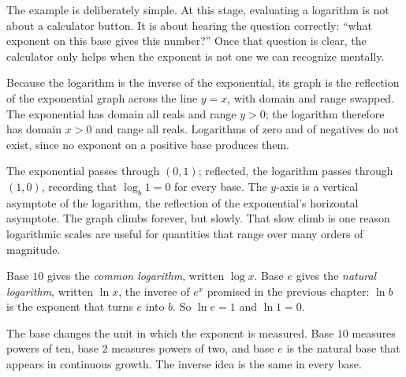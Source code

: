 \documentclass[12pt]{book}
\begin{document}
The example is deliberately simple. At this stage, evaluating a logarithm is not about a
calculator button. It is about hearing the question correctly: ``what exponent on this
base gives this number?'' Once that question is clear, the calculator only helps when the
exponent is not one we can recognize mentally.

Because the logarithm is the inverse of the exponential, its graph is the reflection
of the exponential graph across the line $y=x$, with domain and range swapped. The
exponential has domain all reals and range $y>0$; the logarithm therefore has domain
$x>0$ and range all reals. Logarithms of zero and of negatives do not exist, since no
exponent on a positive base produces them.

\begin{center}
\end{center}

The exponential passes through $(0,1)$; reflected, the logarithm passes through
$(1,0)$, recording that $\log_b 1=0$ for every base. The $y$-axis is a vertical
asymptote of the logarithm, the reflection of the exponential's horizontal asymptote.
The graph climbs forever, but slowly. That slow climb is one reason logarithmic scales
are useful for quantities that range over many orders of magnitude.

\begin{example}
Base $10$ gives the \emph{common logarithm}, written $\log x$. Base $e$ gives the
\emph{natural logarithm}, written $\ln x$, the inverse of $e^{x}$ promised in the
previous chapter: $\ln b$ is the exponent that turns $e$ into $b$. So $\ln e=1$ and
$\ln 1=0$.
\end{example}

The base changes the unit in which the exponent is measured. Base $10$ measures powers
of ten, base $2$ measures powers of two, and base $e$ is the natural base that appears
in continuous growth. The inverse idea is the same in every base.
\end{document}
